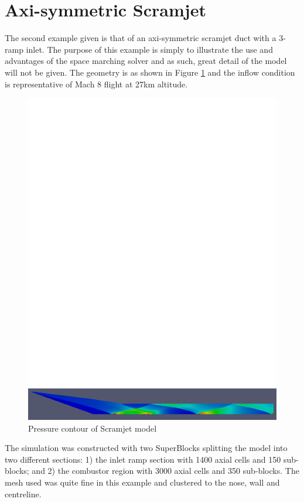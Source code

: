 
\newpage
\section{Axi-symmetric Scramjet}
\label{chapter3-axi-scramjet}
%

The second example given is that of an axi-symmetric scramjet duct with a 3-ramp inlet. The purpose of this example is simply to illustrate the use and advantages of the space marching solver and as such, great detail of the model will not be given. The geometry is as shown in Figure \ref{fig:scramjet_geom} and the inflow condition is representative of Mach 8 flight at 27km altitude. 

\begin{figure}[h]
 \centering
 \includegraphics[width=0.9\linewidth]{./chap3-axi-scramjet/pressure_contour.pdf}
 \caption{Pressure contour of Scramjet model}
 \label{fig:scramjet_geom}
\end{figure}


The simulation was constructed with two SuperBlocks splitting the model into two different sections: 1) the inlet ramp section with 1400 axial cells and 150 sub-blocks; and 2) the combustor region with 3000 axial cells and 350 sub-blocks. The mesh used was quite fine in this example and clustered to the nose, wall and centreline.

